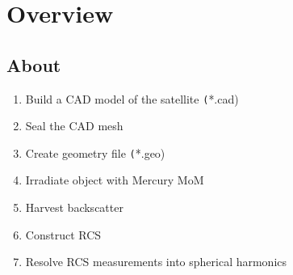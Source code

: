 % 

\section{Overview}

\subsection{About}

\begin{enumerate}[label=(\Alph*)]
	\item Build a CAD model of the satellite \texttt(*.cad)
	\item Seal the CAD mesh
	\item Create geometry file \texttt(*.geo)
	\item Irradiate object with Mercury MoM
	\item Harvest backscatter
	\item Construct RCS
	\item Resolve RCS measurements into spherical harmonics
\end{enumerate}


\endinput  %
